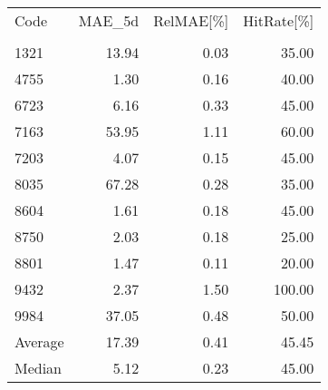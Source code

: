 \begingroup
\footnotesize
\begin{tabular}{lrrr}
\hline
Code & MAE\_5d & RelMAE[\%] & HitRate[\%] \\\\
\hline
1321 & 13.94 & 0.03 & 35.00 \\
4755 & 1.30 & 0.16 & 40.00 \\
6723 & 6.16 & 0.33 & 45.00 \\
7163 & 53.95 & 1.11 & 60.00 \\
7203 & 4.07 & 0.15 & 45.00 \\
8035 & 67.28 & 0.28 & 35.00 \\
8604 & 1.61 & 0.18 & 45.00 \\
8750 & 2.03 & 0.18 & 25.00 \\
8801 & 1.47 & 0.11 & 20.00 \\
9432 & 2.37 & 1.50 & 100.00 \\
9984 & 37.05 & 0.48 & 50.00 \\
Average & 17.39 & 0.41 & 45.45 \\
Median & 5.12 & 0.23 & 45.00 \\
\hline
\end{tabular}
\endgroup
